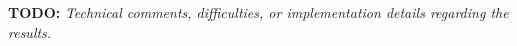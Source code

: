 \textbf{TODO: }
\textit{Technical comments, difficulties, or implementation details regarding the results.}


